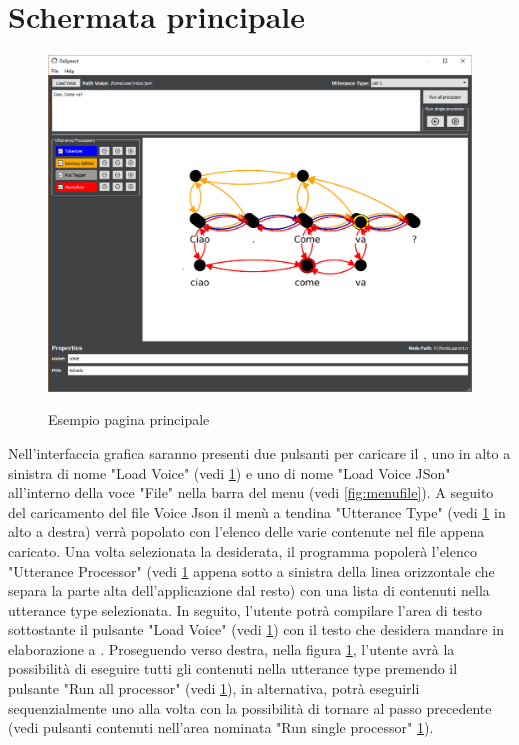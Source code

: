 \documentclass[../AnalisideiRequisiti.tex]{subfiles}
\begin{document}
	\section{Schermata principale}
		\begin{figure}[htp]
			\caption{Esempio pagina principale}
			\centering
			\includegraphics[width=\textwidth]{../img/paginainiziale.png}
			\label{fig:GUI}
		\end{figure}	
		Nell'interfaccia grafica saranno presenti due pulsanti per caricare il , uno in alto a sinistra di nome "Load Voice" (vedi \ref{fig:GUI}) e uno di nome "Load Voice JSon" all'interno della voce "File" nella barra del menu (vedi \ref{fig:menufile}).
		 A seguito del caricamento del file Voice Json il menù a tendina "Utterance Type" (vedi \ref{fig:GUI} in alto a destra) verrà popolato con l'elenco delle varie  contenute nel file appena caricato. 
		 Una volta selezionata la  desiderata, il programma popolerà l'elenco "Utterance Processor" (vedi \ref{fig:GUI} appena sotto a sinistra della linea orizzontale che separa la parte alta dell'applicazione dal resto) con una lista di  contenuti nella utterance type selezionata. 
		 In seguito, l'utente potrà compilare l'area di testo sottostante il pulsante "Load Voice" (vedi \ref{fig:GUI}) con il testo che desidera mandare in elaborazione a .
		 Proseguendo verso destra, nella figura \ref{fig:GUI}, l'utente avrà la possibilità di eseguire tutti gli  contenuti nella utterance type premendo il pulsante "Run all processor" (vedi \ref{fig:GUI}), in alternativa, potrà eseguirli sequenzialmente uno alla volta con la possibilità di tornare al passo precedente (vedi pulsanti contenuti nell'area nominata "Run single processor" \ref{fig:GUI}). 
\end{document}
